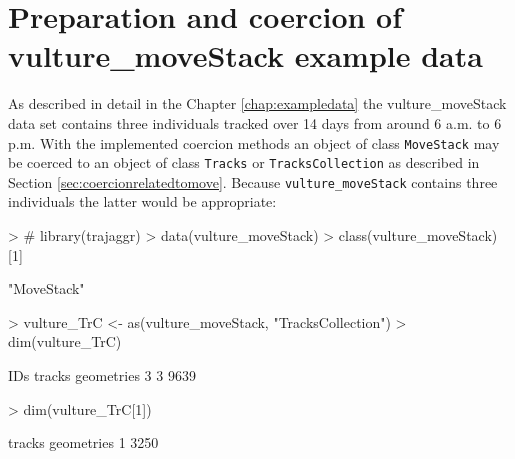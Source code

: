 \documentclass[12pt, oneside, a4paper]{scrbook}
\newcommand{\pkg}[1]{{\normalfont\fontseries{b}\selectfont #1}}
\let\code=\texttt
\newcommand{\codeintitles}[1]{{\tt #1}} %
\begin{document}


\section{Preparation and coercion of vulture\_moveStack example data}
\label{sec:prepvulturemovestackforcount}

As described in detail in the Chapter \ref{chap:exampledata} the vulture\_moveStack data set contains three individuals tracked over 14 days from around 6 a.m. to 6 p.m. With the implemented coercion methods an object of class \code{MoveStack} may be coerced to an object of class \code{Tracks} or \code{TracksCollection} as described in Section \ref{sec:coercionrelatedtomove}. Because \code{vulture\_moveStack} contains three individuals the latter would be appropriate:
\par\medskip

\begin{small}
\begin{Schunk}
\begin{Sinput}
> # library(trajaggr)
> data(vulture_moveStack)
> class(vulture_moveStack)[1]
\end{Sinput}
\begin{Soutput}
[1] "MoveStack"
\end{Soutput}
\begin{Sinput}
> vulture_TrC <- as(vulture_moveStack, "TracksCollection")
> dim(vulture_TrC)
\end{Sinput}
\begin{Soutput}
       IDs     tracks geometries 
         3          3       9639 
\end{Soutput}
\begin{Sinput}
> dim(vulture_TrC[1])
\end{Sinput}
\begin{Soutput}
    tracks geometries 
         1       3250 
\end{Soutput}
\end{Schunk}
\end{small}
\par\medskip
\end{document}
